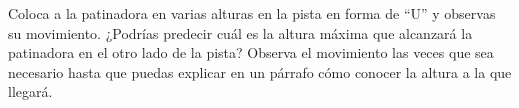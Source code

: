 \question[5] Coloca a la patinadora en varias alturas en la pista en forma de “U” y observas su movimiento. ¿Podrías predecir cuál es la altura máxima que alcanzará la patinadora en el otro lado de la pista? Observa el movimiento las veces que sea necesario hasta que puedas explicar en un párrafo cómo conocer la altura a la que llegará.

\begin{solutionbox}{6cm}
\end{solutionbox}

